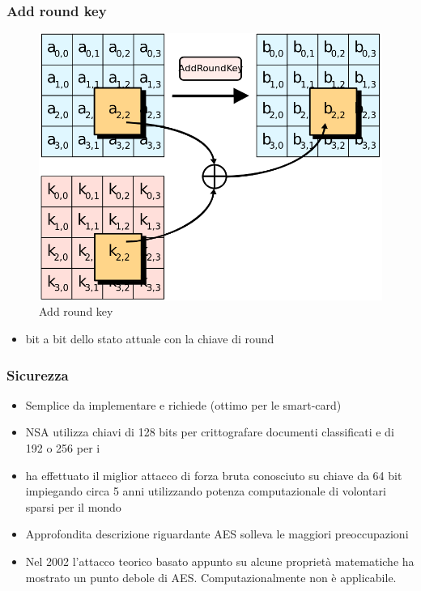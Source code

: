 		\begin{frame}
			\frametitle{Add round key}
			\begin{center}
				\begin{figure}
					\includegraphics[scale=0.1]{img/addroundkey}
					\caption{Add round key}
				\end{figure}
			\end{center}
			\begin{itemize}
				\item {} bit a bit dello stato attuale con la chiave di round
			\end{itemize}
		\end{frame}
	
		\begin{frame}
			\frametitle{Sicurezza}
			{
			\fontsize{10}{0}
			\begin{itemize}
				\item Semplice da implementare e richiede  (ottimo per le smart-card)
				\item NSA utilizza chiavi di 128 bits per crittografare documenti classificati  e di 192 o 256 per i \tblue{TOP SECRET}
				\item {} ha effettuato il miglior attacco di forza bruta conosciuto su chiave da 64 bit impiegando circa 5 anni utilizzando potenza computazionale di volontari sparsi per il mondo
				\item Approfondita descrizione  riguardante AES solleva le maggiori preoccupazioni
				\item Nel 2002 l'attacco teorico  basato appunto su alcune proprietà matematiche ha mostrato un punto debole di AES. Computazionalmente non è applicabile.
			\end{itemize}
			}
		\end{frame}


